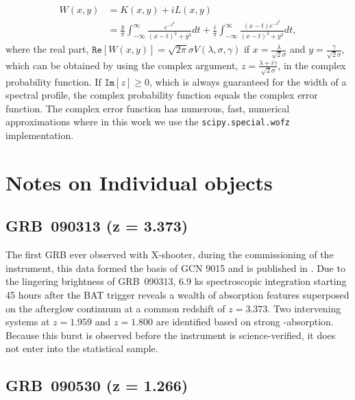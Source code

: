 \documentclass{aa}    %
\begin{document}
\begin{equation} 
\begin{split}
W(x, y)  
& = K(x, y) + i L(x, y) \\
& = \frac{y}{\pi}  \int_{-\infty}^{\infty} \frac{e^{- t^2 }}{(x -  t)^2 +y^2} dt  + \frac{i}{\pi}  \int_{-\infty}^{\infty} \frac{(x - t)e^{- t^2 }}{(x -  t)^2 +y^2} dt,
\end{split}
\end{equation}
where the real part, $\mathtt{Re}[W(x, y)] =  \sqrt{2 \pi} \sigma
V(\lambda,\sigma, \gamma)$ if $x = \frac{\lambda}{\sqrt{2} \sigma}$ and $y =
\frac{\gamma}{\sqrt{2} \sigma}$, which can be obtained by using the complex
argument, $z = \frac{\lambda + i\gamma}{\sqrt{2} \sigma}$, in the complex
probability function. If $\mathtt{Im}[z] \geq 0$, which is always guaranteed for
the width of a spectral profile, the complex probability function equals the
complex error function. The complex error function has numerous, fast, numerical
approximations where in this work we use the \texttt{scipy.special.wofz}
\citep{scipy} implementation.


\section{Notes on Individual objects} \label{notes}

\subsection{GRB~090313 (z = 3.373)} \label{090313}

The first GRB ever observed with X-shooter, during the commissioning of the
instrument, this data formed the basis of GCN 9015 \citep{GCN.9015} and is
published in \citet{DeUgartePostigo2010}. Due to the lingering brightness of
GRB~090313, 6.9 ks spectroscopic integration starting 45 hours after the BAT
trigger reveals a wealth of absorption features superposed on the afterglow
continuum at a common redshift of $z = 3.373$. Two intervening systems at $z =
1.959$ and $z = 1.800$ are identified based on strong \mgii-absorption. Because
this burst is observed before the instrument is science-verified, it does not
enter into the statistical sample.

\subsection{GRB~090530 (z = 1.266)}\label{090530}
\end{document}
